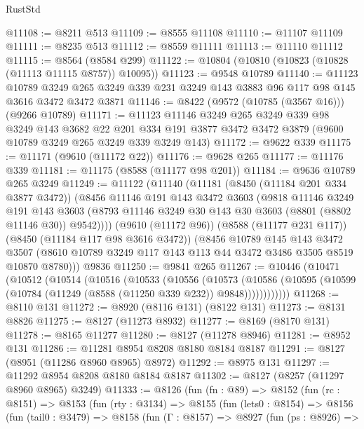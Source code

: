 \begin{lexlean}{RustStd}
\begin{coremodule}
@11108 := @8211 @513
@11109 := @8555 @11108
@11110 := @11107 @11109
@11111 := @8235 @513
@11112 := @8559 @11111
@11113 := @11110 @11112
@11115 := @8564 (@8584 @299)
@11122 := @10804 (@10810 (@10823 (@10828 (@11113 @11115 @8757)) @10095))
@11123 := @9548 @10789
@11140 := @11123
    @10789
    @3249
    @265
    @3249
    @339
    @231
    @3249
    @143
    @3883
    @96
    @117
    @98
    @145
    @3616
    @3472
    @3472
    @3871
@11146 := @8422 (@9572 (@10785 (@3567 @16))) (@9266 @10789)
@11171 := @11123
    @11146
    @3249
    @265
    @3249
    @339
    @98
    @3249
    @143
    @3682
    @22
    @201
    @334
    @191
    @3877
    @3472
    @3472
    @3879
    (@9600 @10789 @3249 @265 @3249 @339 @3249 @143)
@11172 := @9622 @339
@11175 := @11171 (@9610 (@11172 @22))
@11176 := @9628 @265
@11177 := @11176 @339
@11181 := @11175 (@8588 (@11177 @98 @201))
@11184 := @9636 @10789 @265 @3249
@11249 := @11122
    (@11140
      (@11181
        (@8450 (@11184 @201 @334 @3877 @3472))
        (@8456
          @11146
          @191
          @143
          @3472
          @3603
          (@9818
            @11146
            @3249
            @191
            @143
            @3603
            (@8793 @11146 @3249 @30 @143 @30 @3603 (@8801 (@8802 @11146 @30)) @9542))))
      (@9610 (@11172 @96))
      (@8588 (@11177 @231 @117))
      (@8450 (@11184 @117 @98 @3616 @3472))
      (@8456
        @10789
        @145
        @143
        @3472
        @3507
        (@8610 @10789 @3249 @117 @143 @113 @44 @3472 @3486 @3505 @8519 @10870 @8780)))
    @9836
@11250 := @9841 @265
@11267 := @10446
    (@10471
      (@10512
        (@10514
          (@10516
            (@10533
              (@10556
                (@10573
                  (@10586
                    (@10595 (@10599 (@10784 (@11249 (@8588 (@11250 @339 @232)) @9848))))))))))))
@11268 := @8110 @131
@11272 := @8920 (@8116 @131) (@8122 @131)
@11273 := @8131 @8826
@11275 := @8127 (@11273 @8932)
@11277 := @8169 (@8170 @131)
@11278 := @8165 @11277
@11280 := @8127 (@11278 @8946)
@11281 := @8952 @131
@11286 := @11281 @8954 @8208 @8180 @8184 @8187
@11291 := @8127 (@8951 (@11286 @8960 @8965) @8972)
@11292 := @8975 @131
@11297 := @11292 @8954 @8208 @8180 @8184 @8187
@11302 := @8127 (@8257 (@11297 @8960 @8965) @3249)
@11333 := @8126
    (fun (fn : @89) =>
    @8152
      (fun (rc : @8151) =>
      @8153
        (fun (rty : @3134) =>
        @8155
          (fun (lets0 : @8154) =>
          @8156
            (fun (tail0 : @3479) =>
            @8158
              (fun (Γ : @8157) =>
              @8927
                (fun (ps : @8926) =>

\end{coremodule}
\end{lexlean}

